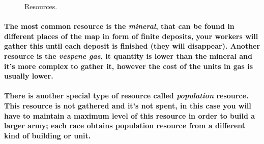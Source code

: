 \documentclass[a4paper,10pt]{article}
\newcommand{\p}[1]{\paragraph{\indent\textnormal{#1}}}
\begin{document}
  \begin{figure}[hbt]
      \centering
       \qquad
      \caption{Resources.}
      \label{fig:res}
      \end{figure}

     \p{The most common resource is the \textit{mineral}, that can be found in different places of the map in form of finite deposits, your workers will gather this until each deposit is finished (they will disappear). Another resource is the \textit{vespene gas}, it quantity is lower than the mineral and it's more complex to gather it, however the cost of the units in gas is usually lower.}

     \p{There is another special type of resource called \textit{population} resource. This resource is not gathered and it's not spent, in this case you will have to maintain a maximum level of this resource in order to build a larger army; each race obtains population resource from a different kind of building or unit.}
\end{document}

